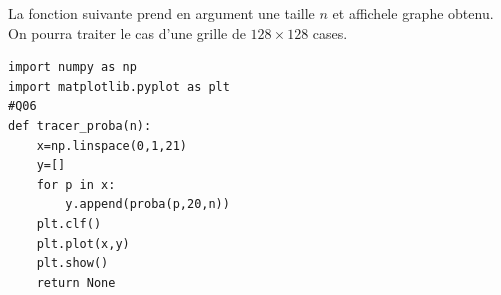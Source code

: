 \documentclass[t,10pt]{article}
\begin{document}




La fonction suivante prend en argument une taille $n$ et affichele graphe obtenu. On pourra traiter le 
cas d'une grille de $128\times 128$ cases.%

\begin{lstlisting}
import numpy as np
import matplotlib.pyplot as plt
#Q06
def tracer_proba(n):
    x=np.linspace(0,1,21)
    y=[]
    for p in x:
        y.append(proba(p,20,n))
    plt.clf()
    plt.plot(x,y)
    plt.show()
    return None
\end{lstlisting}
\end{document}
